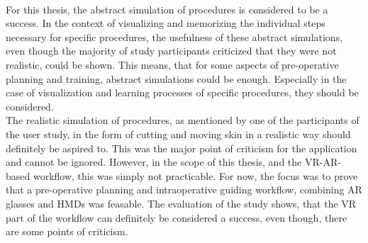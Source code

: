 \\ For this thesis, the abstract simulation of procedures is considered
to be a success. In the context of visualizing and memorizing the individual steps necessary
for specific procedures, the usefulness of these abstract simulations, even
though the majority of study participants criticized that they 
were not realistic, could be shown. This means, that for some 
aspects of pre-operative planning and training, abstract 
simulations could be enough. Especially in the case of visualization and 
learning processes of specific procedures, they should be considered.
\\ The realistic simulation of procedures, as mentioned by one of 
the participants of the user study, in the form of cutting and moving
skin in a realistic way should definitely be aspired to. This 
was the major point of criticism for the application and cannot
be ignored. However, in the scope of this thesis, and the VR-AR-based
workflow, this was simply not practicable. For now, the focus was to
prove that a pre-operative planning and intraoperative guiding workflow, combining
AR glasses and HMDs was feasable. The evaluation of the study shows,
that the VR part of the workflow can definitely be considered a success, 
even though, there are some points of criticism.